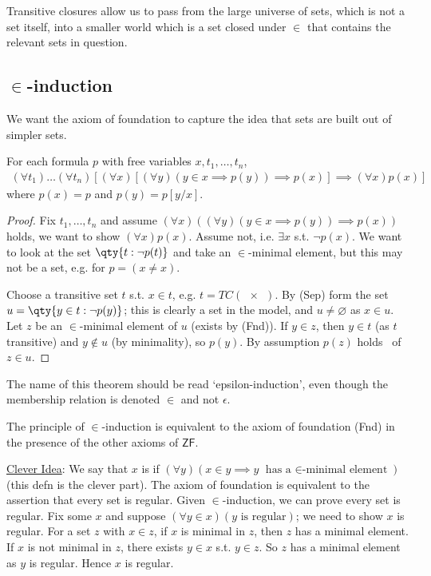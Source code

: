Transitive closures allow us to pass from the large universe of sets, which is not a set itself, into a smaller world which is a set closed under $\in$ that contains the relevant sets in question.

\subsection{\texorpdfstring{$\in$}{∈}-induction}
We want the axiom of foundation to capture the idea that sets are built out of simpler sets.
\begin{theorem}
    For each formula $p$ with free variables $x, t_1, \dots, t_n$,
    \begin{align*}
        (\forall t_1)\dots(\forall t_n)[(\forall x)[(\forall y)(y \in x \implies p(y)) \implies p(x)] \implies (\forall x)p(x)]
    \end{align*}
    where $p(x) = p$ and $p(y) = p[y/x]$.
\end{theorem}

\begin{proof}
    Fix $t_1, \dots, t_n$ and assume $(\forall x)((\forall y)(y \in x \implies p(y)) \implies p(x))$ holds, we want to show $(\forall x)p(x)$.
    Assume not, i.e. $\exists x$ s.t. $\neg p(x)$.
    We want to look at the set $\qty{t : \neg p(t)}$ and take an $\in$-minimal element, but this may not be a set, e.g. for $p = (x \neq x)$.

    Choose a transitive set $t$ s.t. $x \in t$, e.g. $t = TC(\qty{x})$.
    By (Sep) form the set $u = \qty{y \in t : \neg p(y)}$; this is clearly a set in the model, and $u \neq \varnothing$ as $x \in u$.
    Let $z$ be an $\in$-minimal element of $u$ (exists by (Fnd)).
    If $y \in z$, then $y \in t$ (as $t$ transitive) and $y \notin u$ (by minimality), so $p(y)$.
    By assumption $p(z)$ holds \Lightning\ of $z \in u$.
\end{proof}
The name of this theorem should be read `epsilon-induction', even though the membership relation is denoted $\in$ and not $\epsilon$.

The principle of $\in$-induction is equivalent to the axiom of foundation (Fnd) in the presence of the other axioms of $\mathsf{ZF}$.

\underline{Clever Idea}: We say that $x$ is  if $(\forall y)(x \in y \implies y \text{ has a $\in$-minimal element})$ (this defn is the clever part).
The axiom of foundation is equivalent to the assertion that every set is regular.
Given $\in$-induction, we can prove every set is regular.
Fix some $x$ and suppose $(\forall y \in x)(y \text{ is regular})$; we need to show $x$ is regular.
For a set $z$ with $x \in z$, if $x$ is minimal in $z$, then $z$ has a minimal element.
If $x$ is not minimal in $z$, there exists $y \in x$ s.t. $y \in z$.
So $z$ has a minimal element as $y$ is regular.
Hence $x$ is regular.

